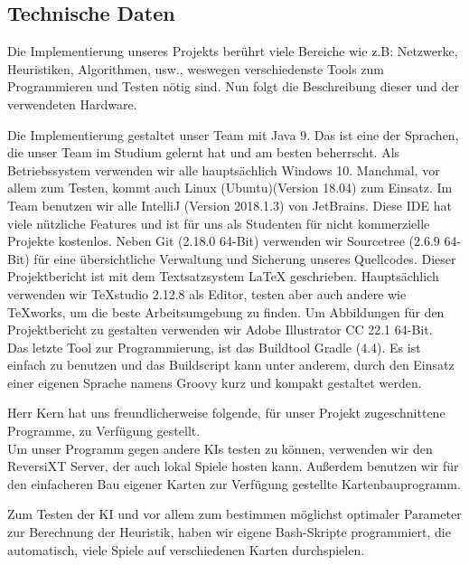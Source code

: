 \documentclass[12pt,a4paper,bibliography=totocnumbered,listof=totocnumbered]{scrartcl}
\begin{document}
    \subsection{Technische Daten}
    \vspace{1em}
	Die Implementierung unseres Projekts berührt viele Bereiche wie z.B: Netzwerke, Heuristiken, Algorithmen, usw., weswegen verschiedenste Tools zum Programmieren und Testen nötig sind. Nun folgt die Beschreibung dieser und der verwendeten Hardware.
	
    Die Implementierung gestaltet unser Team mit Java 9. Das ist eine der Sprachen, die unser Team im Studium gelernt hat und am besten beherrscht. Als Betriebssystem verwenden wir alle hauptsächlich Windows 10. Manchmal, vor allem zum Testen, kommt auch Linux (Ubuntu)(Version 18.04) zum Einsatz. Im Team benutzen wir alle IntelliJ (Version 2018.1.3) von JetBrains. Diese IDE hat viele nützliche Features und ist für uns als Studenten für nicht kommerzielle Projekte kostenlos. Neben Git (2.18.0 64-Bit) verwenden wir Sourcetree (2.6.9 64-Bit) für eine übersichtliche Verwaltung und Sicherung unseres Quellcodes. Dieser Projektbericht ist mit dem Textsatzsystem LaTeX geschrieben. Hauptsächlich verwenden wir TeXstudio 2.12.8 als Editor, testen aber auch andere wie TeXworks, um die beste Arbeitsumgebung zu finden. Um Abbildungen für den Projektbericht zu gestalten verwenden wir Adobe Illustrator CC 22.1 64-Bit.\\
    Das letzte Tool zur Programmierung, ist das Buildtool Gradle (4.4). Es ist einfach zu benutzen und das Buildscript kann unter anderem, durch den Einsatz einer eigenen Sprache namens Groovy kurz und kompakt gestaltet werden. 

	Herr Kern hat uns freundlicherweise folgende, für unser Projekt zugeschnittene Programme, zu Verfügung gestellt.\\
    Um unser Programm gegen andere KIs testen zu können, verwenden wir den ReversiXT Server, der auch lokal Spiele hosten kann. Außerdem benutzen wir für den einfacheren Bau eigener Karten zur Verfügung gestellte Kartenbauprogramm.
    
    Zum Testen der KI und vor allem zum bestimmen möglichst optimaler Parameter zur Berechnung der Heuristik, haben wir eigene Bash-Skripte programmiert, die automatisch, viele Spiele auf verschiedenen Karten durchspielen. 
\end{document}
